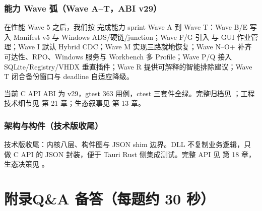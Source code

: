 \documentclass[11pt,a4paper,fontset=none]{ctexart}
\begin{document}
\section{能力 Wave 弧（Wave A--T，ABI v29）}
\begin{say}
 在性能 Wave 5 之后，我们按  完成能力 sprint Wave A 到 Wave T：Wave B/E 写入 Manifest v5 与 Windows ADS/硬链/junction；Wave F/G 引入  与 GUI 作业管理；Wave I 默认 Hybrid CDC；Wave M 实现三路就地恢复；Wave N--O+ 补齐可达性、RPO、Windows 服务与 Workbench 多 Profile；Wave P/Q 接入 SQLite/Registry/VHDX 垂直插件；Wave R 提供可解释的智能排除建议；Wave T 闭合备份窗口与 deadline 自适应降级。

当前 C API ABI 为 v29，gtest 363 用例，ctest 三套件全绿。完整归档见 ；工程技术细节见  第 21 章；生态叙事见  第 13 章。
\end{say}

\section{架构与构件（技术版收尾）}

\showshim
\begin{say}
技术版收尾：内核八层、构件图与 JSON shim 边界。DLL 不复制业务逻辑，只做 C API 的 JSON 封装，便于 Tauri Rust 侧集成测试。完整 API 见  第 18 章，生态决策见 。
\end{say}

\newpage
\part{附录\quad Q\&A 备答（每题约 30 秒）}
\end{document}
